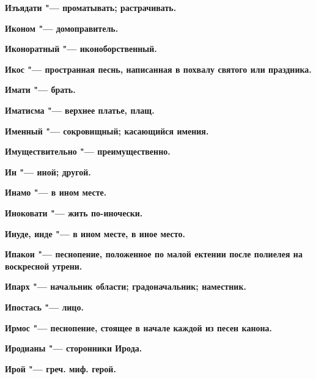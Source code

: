 \begin{mymulticols}{2}
\bfseries Изъядати\normalfont{} "--- проматывать; растрачивать. 




\bfseries Иконом\normalfont{} "--- домоправитель. 




\bfseries Иконоратный\normalfont{} "--- иконоборственный. 




\bfseries Икос\normalfont{} "--- пространная песнь, написанная в похвалу святого или праздника. 




\bfseries Имати\normalfont{} "--- брать. 




\bfseries Иматисма\normalfont{} "--- верхнее платье, плащ. 




\bfseries Именный\normalfont{} "--- сокровищный; касающийся имения. 




\bfseries Имуществительно\normalfont{} "--- преимущественно. 




\bfseries Ин\normalfont{} "--- иной; другой. 




\bfseries Инамо\normalfont{} "--- в ином месте. 




\bfseries Иноковати\normalfont{} "--- жить по-иночески. 




\bfseries Инуде, инде\normalfont{} "--- в ином месте, в иное место. 




\bfseries Ипакои\normalfont{} "--- песнопение, положенное по малой ектении после полиелея на воскресной утрени. 




\bfseries Ипарх\normalfont{} "--- начальник области; градоначальник; наместник. 




\bfseries Ипостась\normalfont{} "--- лицо. 




\bfseries Ирмос\normalfont{} "--- песнопение, стоящее в начале каждой из песен канона. 




\bfseries Иродианы\normalfont{} "--- сторонники Ирода. 




\bfseries Ирой\normalfont{} "--- греч. миф. герой. 





\end{mymulticols}
